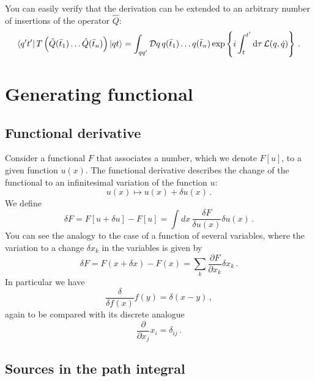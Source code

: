 \documentclass[notes]{subfiles}
\begin{document}
You can easily verify that the derivation can be extended to
an arbitrary number of insertions of the operator $\hat{Q}$:
\begin{align}
\label{eq:TOrderNPt}
\bra{q't'} T\left(\hat{Q}(\bar{t}_1) \ldots \hat{Q}(\bar{t}_n)
  \right)\ket{qt} = 
  \int_{qq'} \mathcal{D}q\, q(\bar{t}_1) \ldots q(\bar{t}_n) 
  \exp \left\{
  i \int_t^{t'} \dd{\tau} \mathcal{L}(q,\dot{q})
  \right\}\, .
\end{align}

\section{Generating functional}
\label{sec:gener-funct}

\subsection{Functional derivative}
\label{sec:funct-deriv}

Consider a functional $F$ that associates a number, which we denote
$F[u]$, to a given function $u(x)$. The functional derivative
describes the change of the functional to an infinitesimal variation
of the function $u$: 
\[
  u(x) \mapsto u(x) + \delta u(x)\, .
\]
We define
\begin{equation}
  \label{eq:FuncDer}
  \delta F = F[u+\delta u] - F[u] = \int dx\, \frac{\delta F}{\delta
    u(x)} \delta u(x)\, .
\end{equation}
You can see the analogy to the case of a function of several
variables, where the variation to a change $\delta x_k$ in the
variables is given by
\begin{equation}
  \label{eq:NormDer}
  \delta F = F(x+\delta x) - F(x) = \sum_k \frac{\partial F}{\partial
    x_k} \delta x_k\, .
\end{equation}
In particular we have
\begin{equation}
  \label{eq:DiracDelta}
  \frac{\delta}{\delta f(x)} f(y) = \delta(x-y)\, , 
\end{equation}
again to be compared with its discrete analogue
\begin{equation}
  \label{eq:KroneckerDelta}
  \frac{\partial}{\partial x_j} x_i = \delta_{ij}\, .
\end{equation}

\subsection{Sources in the path integral}
\label{sec:sourc-path-integr}
\end{document}
